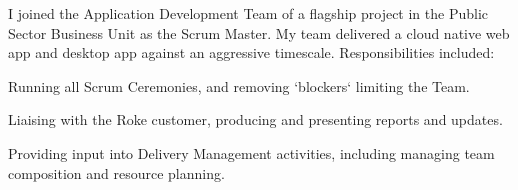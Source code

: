 I joined the Application Development Team of a flagship project in the Public Sector Business Unit as the Scrum Master.
My team delivered a cloud native web app and desktop app against an aggressive timescale.
Responsibilities included:
\vspace{0.25em}
\begin{tightemize}
  \item Running all Scrum Ceremonies, and removing `blockers` limiting the Team.
  \item Liaising with the Roke customer, producing and presenting reports and updates.
  \item Providing input into Delivery Management activities, including managing team composition and resource planning.
\end{tightemize}
\sectionsep{}
